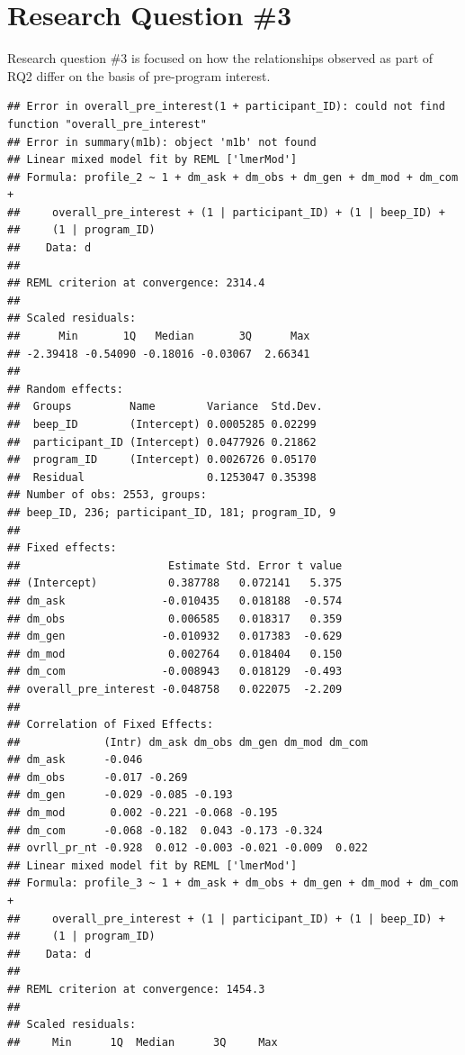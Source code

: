 \documentclass[]{msu-thesis}
\theoremstyle{definition}
\theoremstyle{definition}
\theoremstyle{definition}
\theoremstyle{remark}
\begin{document}
\section{Research Question \#3}\label{research-question-3}

Research question \#3 is focused on how the relationships observed as
part of RQ2 differ on the basis of pre-program interest.

\begin{verbatim}
## Error in overall_pre_interest(1 + participant_ID): could not find function "overall_pre_interest"
## Error in summary(m1b): object 'm1b' not found
## Linear mixed model fit by REML ['lmerMod']
## Formula: profile_2 ~ 1 + dm_ask + dm_obs + dm_gen + dm_mod + dm_com +  
##     overall_pre_interest + (1 | participant_ID) + (1 | beep_ID) +  
##     (1 | program_ID)
##    Data: d
## 
## REML criterion at convergence: 2314.4
## 
## Scaled residuals: 
##      Min       1Q   Median       3Q      Max 
## -2.39418 -0.54090 -0.18016 -0.03067  2.66341 
## 
## Random effects:
##  Groups         Name        Variance  Std.Dev.
##  beep_ID        (Intercept) 0.0005285 0.02299 
##  participant_ID (Intercept) 0.0477926 0.21862 
##  program_ID     (Intercept) 0.0026726 0.05170 
##  Residual                   0.1253047 0.35398 
## Number of obs: 2553, groups:  
## beep_ID, 236; participant_ID, 181; program_ID, 9
## 
## Fixed effects:
##                       Estimate Std. Error t value
## (Intercept)           0.387788   0.072141   5.375
## dm_ask               -0.010435   0.018188  -0.574
## dm_obs                0.006585   0.018317   0.359
## dm_gen               -0.010932   0.017383  -0.629
## dm_mod                0.002764   0.018404   0.150
## dm_com               -0.008943   0.018129  -0.493
## overall_pre_interest -0.048758   0.022075  -2.209
## 
## Correlation of Fixed Effects:
##             (Intr) dm_ask dm_obs dm_gen dm_mod dm_com
## dm_ask      -0.046                                   
## dm_obs      -0.017 -0.269                            
## dm_gen      -0.029 -0.085 -0.193                     
## dm_mod       0.002 -0.221 -0.068 -0.195              
## dm_com      -0.068 -0.182  0.043 -0.173 -0.324       
## ovrll_pr_nt -0.928  0.012 -0.003 -0.021 -0.009  0.022
## Linear mixed model fit by REML ['lmerMod']
## Formula: profile_3 ~ 1 + dm_ask + dm_obs + dm_gen + dm_mod + dm_com +  
##     overall_pre_interest + (1 | participant_ID) + (1 | beep_ID) +  
##     (1 | program_ID)
##    Data: d
## 
## REML criterion at convergence: 1454.3
## 
## Scaled residuals: 
##     Min      1Q  Median      3Q     Max 

\end{verbatim}
\end{document}
